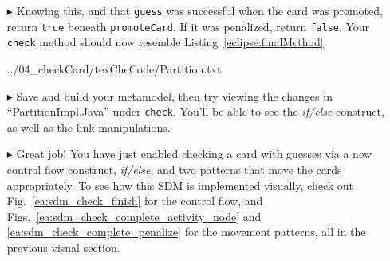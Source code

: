 \begin{itemize}
\item[$\blacktriangleright$] Knowing this, and that \texttt{guess} was successful
when the card was promoted, return \texttt{true} beneath \texttt{promoteCard}. If it was penalized, return \texttt{false}. Your \texttt{check} method
should now resemble Listing~\ref{eclipse:finalMethod}.

\vspace{0.5cm}

 {../04_checkCard/texCheCode/Partition.txt} 

\vspace{0.5cm}

\item[$\blacktriangleright$] Save and build your metamodel, then try viewing the changes in ``PartitionImpl.Java'' under \texttt{check}. You'll be able to
see the \emph{if/else} construct, as well as the link manipulations. 

\vspace{0.5cm}

\item[$\blacktriangleright$] Great job! You have just enabled checking a card with guesses via a new control flow construct, \emph{if/else}, and two patterns
that move the cards appropriately. To see how this SDM is implemented visually, check out Fig.~\ref{ea:sdm_check_finish} for the control flow, and
Figs.~\ref{ea:sdm_check_complete_activity_node} and \ref{ea:sdm_check_complete_penalize} for the movement patterns, all in the previous visual section.

\end{itemize}
 